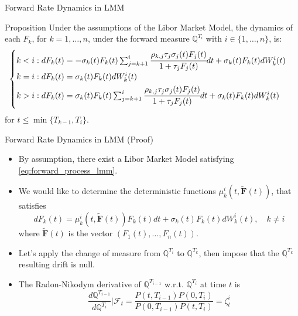 \documentclass{beamer}
\begin{document}
\begin{frame}{Forward Rate Dynamics in LMM}
  \begin{block}{Proposition}
    Under the assumptions of the Libor Market Model, the dynamics of each $F_k$, for $k = 1,\ldots, n$, under the forward measure $\mathbb{Q}^{T_i}$ with $i \in \{1,\ldots, n\}$, is:
    \begin{equation}
      \begin{cases}
	k < i: dF_k(t) = -\sigma_k(t)F_k(t)\sum_{j=k+1}^i\cfrac{\rho_{k,j}\tau_j\sigma_j(t)F_j(t)}{1+\tau_jF_j(t)}dt + \sigma_k(t)F_k(t)dW^i_k(t) \\ \vspace{0.1cm}
	k = i : dF_k(t) = \sigma_k(t)F_k(t)dW_k^i(t) \\
	\vspace{0.1cm}
	k > i : dF_k(t) = \sigma_k(t)F_k(t)\sum_{j=k+1}^i\cfrac{\rho_{k,j}\tau_j\sigma_j(t)F_j(t)}{1+\tau_jF_j(t)}dt + \sigma_k(t)F_k(t)dW^i_k(t)		
      \end{cases}
  	\label{eq:forward_rat_dynamics_lfm}
    \end{equation}
    for $t \le \min\{T_{k-1}, T_i\}$.
  \end{block}
\end{frame}

\begin{frame}{Forward Rate Dynamics in LMM (Proof)}
  \begin{itemize}
  \item<1-> By assumption, there exist a Libor Market Model satisfying \cref{eq:forward_process_lmm}.
  \item<2-> We would like to determine the deterministic functions $\mu_k^i(t, \bm{\tilde{F}}(t))$, that satisfies
    \begin{equation}
      dF_k(t) = \mu_k^i(t, \bm{\tilde{F}}(t))F_k(t)dt + \sigma_k(t)F_k(t)dW^i_k(t),\quad k\neq i
      \label{eq:forward_dynamics_in_lfm}
    \end{equation}
 where $\bm{\tilde{F}}(t)$ is the vector $(F_1(t),\ldots, F_n(t))$.
  \item<3-> Let's apply the change of measure from $\mathbb{Q}^{T_i}$ to $\mathbb{Q}^{T_k}$, then impose that the $\mathbb{Q}^{T_k}$ resulting drift is null. 
  \item<4-> The Radon-Nikodym derivative of $\mathbb{Q}^{T_{i-1}}$ w.r.t. $\mathbb{Q}^{T_i}$ at time $t$ is
    \begin{equation*}
      \frac{d\mathbb{Q}^{T_{i-1}}}{d\mathbb{Q}^{T_i}}\bigg|\mathcal{F}_t = \frac{P(t, T_{i-1})P(0, T_i)}{P(0, T_{i-1})P(t, T_i)} = \zeta^i_t
    \end{equation*}
  \end{itemize}
\end{frame}
\end{document}
